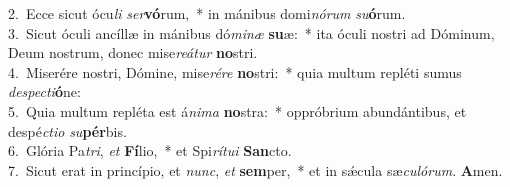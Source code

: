 {2.~}Ecce sicut ócu\textit{li} \textit{ser}\textbf{vó}rum,~* in mánibus domi\textit{nó}\textit{rum} \textit{su}\textbf{ó}rum.\\
{3.~}Sicut óculi ancíllæ in mánibus dó\textit{mi}\textit{næ} \textbf{su}æ:~* ita óculi nostri ad Dóminum, Deum nostrum, donec mise\textit{re}\textit{á}\textit{tur} \textbf{no}stri.\\
{4.~}Miserére nostri, Dómine, mise\textit{ré}\textit{re} \textbf{no}stri:~* quia multum repléti sumus \textit{de}\textit{spe}\textit{cti}\textbf{ó}ne:\\
{5.~}Quia multum repléta est á\textit{ni}\textit{ma} \textbf{no}stra:~* oppróbrium abundántibus, et despé\textit{cti}\textit{o} \textit{su}\textbf{pér}bis.\\
{6.~}Glória Pa\textit{tri}, \textit{et} \textbf{Fí}lio,~* et Spi\textit{rí}\textit{tu}\textit{i} \textbf{San}cto.\\
{7.~}Sicut erat in princípio, et \textit{nunc}, \textit{et} \textbf{sem}per,~* et in sǽcula sæ\textit{cu}\textit{ló}\textit{rum}. \textbf{A}men.\\
